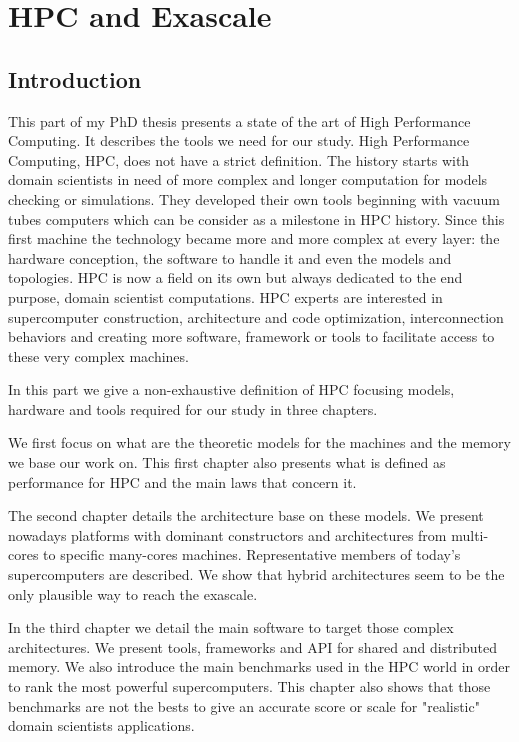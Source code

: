 \part{HPC and Exascale}
\chapter*{Introduction}

This part of my PhD thesis presents a state of the art of High Performance Computing.
It describes the tools we need for our study. 
High Performance Computing, HPC, does not have a strict definition. 
The history starts with domain scientists in need of more complex and longer computation for models checking or simulations. 
They developed their own tools beginning  with vacuum tubes computers which can be consider as a milestone in HPC history. 
Since this first machine the technology became more and more complex at every layer: the hardware conception, the software to handle it and even the models and topologies.
HPC is now a field on its own but always dedicated to the end purpose, domain scientist computations. 
HPC experts are interested in supercomputer construction, architecture and code optimization, interconnection behaviors and creating more software, framework or tools to facilitate access to these very complex machines. 

In this part we give a non-exhaustive definition of HPC focusing models, hardware and tools required for our study in three chapters.

We first focus on what are the theoretic models for the machines and the memory we base our work on. 
This first chapter also presents what is defined as performance for HPC and the main laws that concern it. 

The second chapter details the architecture base on these models. 
We present nowadays platforms with dominant constructors and architectures from multi-cores to specific many-cores machines. 
Representative members of today's supercomputers are described.  
We show that hybrid architectures seem to be the only plausible way to reach the exascale. 

In the third chapter we detail the main software to target those complex architectures. 
We present tools, frameworks and API for shared and distributed memory. 
We also introduce the main benchmarks used in the HPC world in order to rank the most powerful supercomputers. 
This chapter also shows that those benchmarks are not the bests to give an accurate score or scale for "realistic" domain scientists applications.

